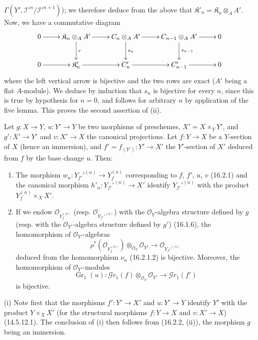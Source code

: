 $\Gamma(Y',\mathscr{I}'^n/\mathscr{I}'^{n+1})$); we therefore deduce from the
above that $\mathfrak{K}'_n=\mathfrak{K}_n\otimes_A A'$. Now, we have a
commutative diagram
\[
  \xymatrix{
    0 \ar[r] &
    \mathfrak{K}_n\otimes_A A' \ar[r]\ar[d]^r &
    C_n\otimes_A A' \ar[r]\ar[d]^{s_n} &
    C_{n-1}\otimes_A A' \ar[r]\ar[d]^{s_{n-1}} & 0 \\
    0 \ar[r] &
    \mathfrak{K}'_n \ar[r] &
    C'_n \ar[r] &
    C'_{n-1} \ar[r] & 0
  }
\]
where the left vertical arrow is bijective and the two rows are exact
($A'$ being a flat $A$-module). We deduce by induction that $s_n$ is
bijective for every $n$, since this is true by hypothesis for $n=0$, and follows
for arbitrary $n$ by application of the five lemma. This proves the second
assertion of (ii).

\begin{corollary}[16.2.3]
\label{IV.16.2.3}
Let $g:X\to Y$, $u:Y'\to Y$ be two morphisms of preschemes,
$X'=X\times_Y Y'$, and $g':X'\to Y'$ and $v:X'\to X$ the canonical projections.
Let $f:Y\to X$ be a $Y$-section of $X$ (hence an immersion), and
$f'=f_{(Y')}:Y'\to X'$ the $Y'$-section of $X'$ deduced from $f$ by the
base change $u$. Then:
\begin{enumerate}
\item[(i)] The morphism
$w_n:Y_{f'}'^{(n)}\to Y_f^{(n)}$ corresponding to $f$, $f'$, $u$, $v$
(16.2.1) and the canonical morphism
$h'_n:Y_{f'}'^{(n)}\to X'$ identify $Y_{f'}'^{(n)}$ with the product
$Y_f^{(n)}\times_X X'$.
\item[(ii)] If we endow $\mathcal{O}_{Y_f^{(n)}}$ (resp.
$\mathcal{O}_{Y_{f'}'^{(n)}}$) with the $\mathcal{O}_Y$-algebra structure
defined by $g$ (resp. with the $\mathcal{O}_{Y'}$-algebra structure defined
by $g'$) (16.1.6), the homomorphism of $\mathcal{O}_{Y'}$-algebras
\[
  \rho^*(\mathcal{O}_{Y_f^{(n)}})
  \otimes_{\mathcal{O}_Y}\mathcal{O}_{Y'}
  \longrightarrow
  \mathcal{O}_{Y_{f'}'^{(n)}}
  \tag{16.2.3.1}
  \label{IV.16.2.3.1}
\]
deduced from the homomorphism $\nu_n$ (16.2.1.2) is bijective. Moreover,
the homomorphism of $\mathcal{O}_{Y'}$-modules
\[
  \operatorname{Gr}_1(u):
  \mathscr{G}r_1(f)\otimes_{\mathcal{O}_Y}\mathcal{O}_{Y'}
  \longrightarrow\mathscr{G}r_1(f')
  \tag{16.2.3.2}
  \label{IV.16.2.3.2}
\]
is bijective.
\end{enumerate}
\end{corollary}

\noindent(i) Note first that the morphisms $f':Y'\to X'$ and $u:Y'\to Y$
identify $Y'$ with the product $Y\times_X X'$ (for the structural morphisms
$f:Y\to X$ and $v:X'\to X$) (14.5.12.1). The conclusion of (i) then follows from
(16.2.2, (ii)), the morphism $g$ being an immersion.

